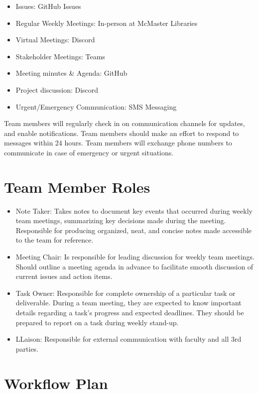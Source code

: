 \documentclass{article}
\begin{document}
\begin{itemize}
    \item Issues: GitHub Issues
    \item Regular Weekly Meetings: In-person at McMaster Libraries
    \item Virtual Meetings: Discord
    \item Stakeholder Meetings: Teams
    \item Meeting minutes \& Agenda: GitHub
    \item Project discussion: Discord
    \item Urgent/Emergency Communication: SMS Messaging
\end{itemize}

Team members will regularly check in on communication channels for updates,
and enable notifications. Team members should make an effort to respond to messages within
24 hours. Team members will exchange phone numbers to communicate in case of emergency or urgent situations.

\section{Team Member Roles}

\begin{itemize}
    \item{Note Taker: Takes notes to document key events that occurred during weekly team meetings,
 summarizing key decisions made during the meeting. Responsible for producing 
organized, neat, and concise notes made accessible to the team for reference.\newline}
    \item {Meeting Chair: Is responsible for leading discussion for weekly team meetings. Should outline a
meeting agenda in advance to facilitate smooth discussion of current issues and action items. \newline}
    \item {Task Owner: Responsible for complete ownership of a particular task or deliverable. During a team meeting,
they are expected to know important details regarding a task's progress and expected deadlines. They should 
be prepared to report on a task during weekly stand-up.}
    \item{LLaison: Responsible for external communication with faculty and all 3rd parties.\newline}
\end{itemize}

\section{Workflow Plan}
\end{document}
